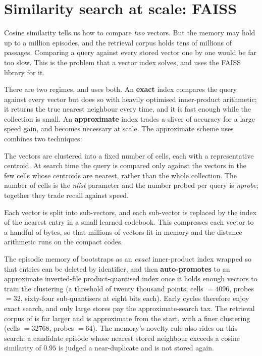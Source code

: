 \section{Similarity search at scale: FAISS}
\label{sec:prereq-faiss}

Cosine similarity tells us how to compare \emph{two} vectors. But the memory may
hold up to a million episodes, and the retrieval corpus holds tens of millions of
passages. Comparing a query against every stored vector one by one would be far
too slow. This is the problem that a vector index solves, and \caem{} uses the
FAISS library for it.

There are two regimes, and \caem{} uses both. An \textbf{exact} index compares
the query against every vector but does so with heavily optimised inner-product
arithmetic; it returns the true nearest neighbour every time, and it is fast
enough while the collection is small. An \textbf{approximate} index trades a sliver
of accuracy for a large speed gain, and becomes necessary at scale. The
approximate scheme \caem{} uses combines two techniques:

\begin{description}[leftmargin=0pt, labelsep=0.5em, style=nextline]
  \item[Inverted file (IVF).] The vectors are clustered into a fixed number of
  cells, each with a representative centroid. At search time the query is compared
  only against the vectors in the few cells whose centroids are nearest, rather
  than the whole collection. The number of cells is the \emph{nlist} parameter and
  the number probed per query is \emph{nprobe}; together they trade recall against
  speed.
  \item[Product quantisation (PQ).] Each vector is split into sub-vectors, and
  each sub-vector is replaced by the index of the nearest entry in a small learned
  codebook. This compresses each vector to a handful of bytes, so that millions of
  vectors fit in memory and the distance arithmetic runs on the compact codes.
\end{description}

\begin{fromcode}
The episodic memory of  bootstraps as an \emph{exact}
inner-product index wrapped so that entries can be deleted by identifier, and then
\textbf{auto-promotes} to an approximate inverted-file product-quantised index once
it holds enough vectors to train the clustering (a threshold of twenty thousand
points; cells $=4096$, probes $=32$, sixty-four sub-quantisers at eight bits
each). Early cycles therefore enjoy exact search, and only large stores pay the
approximate-search tax. The retrieval corpus of  is far larger and
is approximate from the start, with a finer clustering (cells $=32768$, probes
$=64$). The memory's novelty rule also rides on this search: a candidate episode
whose nearest stored neighbour exceeds a cosine similarity of $0.95$ is judged a
near-duplicate and is not stored again.
\end{fromcode}

